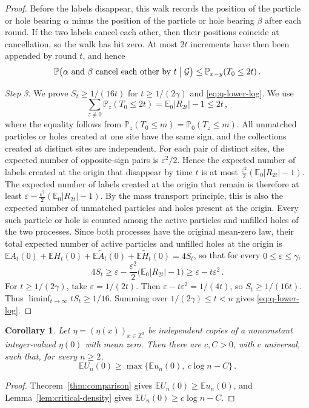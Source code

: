 \documentclass[11pt]{amsart}
\theoremstyle{plain}
\newtheorem{corollary}[theorem]{Corollary}
\theoremstyle{definition}
\newcommand{\Z}{\mathbb{Z}}
\newcommand{\E}{\mathbb{E}}
\renewcommand{\P}{\mathbb{P}}
\newcommand{\eps}{\varepsilon}
\begin{document}
\begin{proof}
	Before the labels disappear, this walk records the position of the particle or
	hole bearing $\alpha$ minus the position of the particle or hole bearing
	$\beta$ after each round. If the two labels cancel each other, then their positions coincide at
	cancellation, so the walk has hit zero. At most $2t$ increments
	have then been appended by round $t$, and hence
	\[
		\P\bigl(\alpha\text{ and }\beta\text{ cancel each other by }t
		\bigm|\mathcal G\bigr)
		\leq\P_{x-y}(T_0\leq2t)\,.
	\]

	\smallskip
	\noindent\emph{Step 3.} We prove $S_t\geq1/(16t)$ for
	$t\geq1/(2\gamma)$ and \eqref{eq:q-lower-log}.
	We use
	\[
		\sum_{z\neq0}\P_z(T_0\leq2t)
		=\E_0|R_{2t}|-1\leq2t\,,
	\]
	where the equality follows from $\P_z(T_0\leq m)=\P_0(T_z\leq m)$.
	All unmatched particles or holes created at one site have the same sign, and
	the collections created at distinct sites are independent. For each pair of
	distinct sites, the expected number of opposite-sign pairs is $\eps^2/2$.
	Hence the expected number of labels created at the origin that disappear by
	time $t$ is at most
	$\tfrac{\eps^2}{2}(\E_0|R_{2t}|-1)$. The expected number of labels created at
	the origin that remain is therefore at least
	$\eps-\tfrac{\eps^2}{2}(\E_0|R_{2t}|-1)$. By the mass transport principle, this is also the
	expected number of unmatched particles and holes present at the origin. Every
	such particle or hole is counted among the active particles and unfilled holes
	of the two processes. Since both processes have the original mean-zero law,
	their total expected number of active particles and unfilled holes at the
	origin is
	$\E A_t(0)+\E H_t(0)+\E\widetilde A_t(0)+\E\widetilde H_t(0)=4S_t$, so that
	for every $0\leq\eps\leq\gamma$,
	\[
		4S_t\geq\eps-\frac{\eps^2}{2}\bigl(\E_0|R_{2t}|-1\bigr)
		\geq\eps-t\eps^2\,.
	\]
	For $t\geq1/(2\gamma)$, take $\eps=1/(2t)$. Then $\eps-t\eps^2=1/(4t)$, so
	$S_t\geq1/(16t)$. Thus $\liminf_{t\to\infty}tS_t\geq1/16$. Summing over
	$1/(2\gamma)\leq t<n$ gives \eqref{eq:q-lower-log}.
\end{proof}

\begin{corollary}\label{cor:critical}
	Let $\eta=(\eta(x))_{x\in\Z^d}$ be independent copies of a nonconstant integer-valued
	$\eta(0)$ with mean zero. Then there are $c,C>0$, with $c$ universal, such
	that, for every $n\geq2$,
	\[
		\E U_n(0)\geq\max\bigl\{\E u_n(0),\ c\log n-C\bigr\}\,.
	\]
\end{corollary}

\begin{proof}
	Theorem~\ref{thm:comparison} gives
	$\E U_n(0)\geq\E u_n(0)$, and Lemma~\ref{lem:critical-density} gives
	$\E U_n(0)\geq c\log n-C$.
\end{proof}
\end{document}

